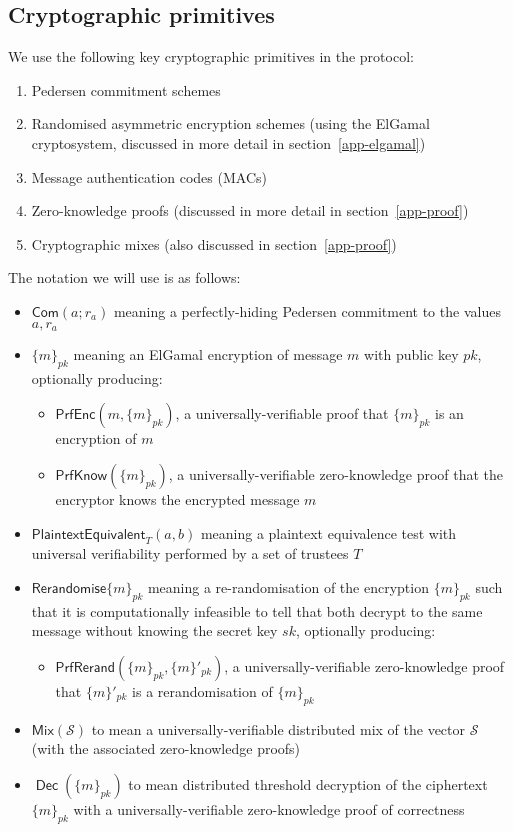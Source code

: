 \documentclass[11pt,twoside,a4paper]{article}
\DeclareMathOperator{\Dec}{\mathsf{Dec}}
\newcommand{\commit}{\mathsf{Com}}
\newcommand{\PrfEnc}{\mathsf{PrfEnc}}
\newcommand{\PrfKnow}{\mathsf{PrfKnow}}
\newcommand{\rerand}{\mathsf{Rerandomise}}
\newcommand{\PrfRerand}{\mathsf{PrfRerand}}
\newcommand{\pet}{\mathsf{PlaintextEquivalent}}
\theoremstyle{definition}
\newcommand{\Mix}{\mathsf{Mix}}
\begin{document}
\subsection{Cryptographic primitives}
We use the following key cryptographic primitives in the protocol:
\begin{enumerate}
    \item Pedersen commitment schemes
    \item Randomised asymmetric encryption schemes (using the ElGamal cryptosystem, discussed in more detail in section~\ref{app-elgamal})
    \item Message authentication codes (MACs)
    \item Zero-knowledge proofs (discussed in more detail in section~\ref{app-proof})
    \item Cryptographic mixes (also discussed in section~\ref{app-proof})
\end{enumerate}
The notation we will use is as follows:
\begin{itemize}
	\item $\commit(a;r_a)$ meaning a perfectly-hiding Pedersen commitment to the values $a, r_a$
	\item $\{m\}_{pk}$ meaning an ElGamal encryption of message $m$ with public key $pk$, optionally producing:
	\begin{itemize}
		\item $\PrfEnc(m, \{m\}_{pk})$, a universally-verifiable proof that $\{m\}_{pk}$ is an encryption of $m$
		\item $\PrfKnow(\{m\}_{pk})$, a universally-verifiable zero-knowledge proof that the encryptor knows the encrypted message $m$
	\end{itemize}
	\item $\pet_T(a, b)$ meaning a plaintext equivalence test with universal verifiability performed by a set of trustees $T$
	\item $\rerand\{m\}_{pk}$ meaning a re-randomisation of the encryption $\{m\}_{pk}$ such that it is computationally infeasible to tell that both decrypt to the same message without knowing the secret key $sk$, optionally producing:
	\begin{itemize}
		\item $\PrfRerand(\{m\}_{pk}, \{m\}'_{pk})$, a universally-verifiable zero-knowledge proof that $\{m\}'_{pk}$ is a rerandomisation of $\{m\}_{pk}$
	\end{itemize}
	\item $\Mix(\mathcal{S})$ to mean a universally-verifiable distributed mix of the vector $\mathcal{S}$ (with the associated zero-knowledge proofs)
	\item $\Dec(\{m\}_{pk})$ to mean distributed threshold decryption of the ciphertext $\{m\}_{pk}$ with a universally-verifiable zero-knowledge proof of correctness
\end{itemize}
\end{document}

